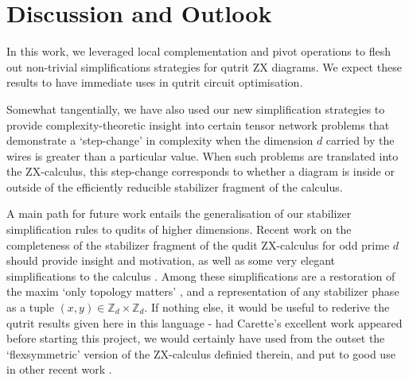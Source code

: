 \section{Discussion and Outlook}

In this work, we leveraged local complementation and pivot operations to flesh out non-trivial simplifications strategies for qutrit ZX diagrams. We expect these results to have immediate uses in qutrit circuit optimisation. 

Somewhat tangentially, we have also used our new simplification strategies to provide complexity-theoretic insight into certain tensor network problems that demonstrate a `step-change' in complexity when the dimension $d$ carried by the wires is greater than a particular value. When such problems are translated into the ZX-calculus, this step-change corresponds to whether a diagram is inside or outside of the efficiently reducible stabilizer fragment of the calculus.



A main path for future work entails the generalisation of our stabilizer simplification rules to qudits of higher dimensions. Recent work on the completeness of the stabilizer fragment of the qudit ZX-calculus for odd prime $d$ should provide insight and motivation, as well as some very elegant simplifications to the calculus \cite{Booth_2022}. Among these simplifications are a restoration of the maxim `only topology matters' \cite{Carette_2021}, and a representation of any stabilizer phase as a tuple $(x, y) \in \mathbb{Z}_d \times \mathbb{Z}_d$. If nothing else, it would be useful to rederive the qutrit results given here in this language - had Carette's excellent work \cite{Carette_2021} appeared before starting this project, we would certainly have used from the outset the `flexsymmetric' version of the ZX-calculus definied therein, and put to good use in other recent work \cite{van_de_Wetering_2022}. 

